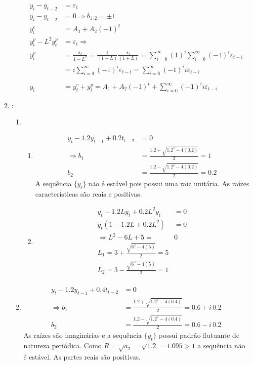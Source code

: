 \begin{enumerate}
\begin{enumerate}
		\begin{align*}
			y_t-y_{t-2}&=\varepsilon_t\\
			y_t-y_{t-2}&=0 \Rightarrow b_{1,2}=\pm1\\
			y_t^c&=A_1+A_2(-1)^t\\
			y_t^p-L^2y_t^p&=\varepsilon_t\Rightarrow\\ y_t^p&=\frac{\varepsilon_t}{1-L^2}=\frac{1}{(1-L)}\frac{\varepsilon_t}{(1+L)}=\sum \limits_{i=0}^{\infty}(1)^i\sum \limits_{i=0}^{\infty}(-1)^i\varepsilon_{t-i}\\
			&=i\sum \limits_{i=0}^{\infty}(-1)^i\varepsilon_{t-i}=\sum \limits_{i=0}^{\infty}(-1)^ii\varepsilon_{t-i}\\
			\\
			y_t&=y_t^c+y_t^p=A_1+A_2(-1)^t+\sum \limits_{i=0}^{\infty}(-1)^ii\varepsilon_{t-i}
		\end{align*}
	
	\end{enumerate}
	
	\item %
	:
	\begin{enumerate}
		
		\item %
		\begin{enumerate}
			\item %
		
		\begin{align*}
			y_t-1.2y_{t-1}+0.2t_{t-2}&=0\\
			\Rightarrow b_1&=\frac{1.2+\sqrt{1.2^2-4(0.2)}}{2}=1\\
			b_2&=\frac{1.2-\sqrt{1.2^2-4(0.2)}}{2}=0.2
		\end{align*}		
		A sequência $\{y_t\}$ não é estável pois possui uma raiz unitária. As raízes características são reais e positivas.
		
		\item %
		
		\begin{align*}
			y_t-1.2Ly_t+0.2L^2y_t&=0\\
			y_t(1-1.2L+0.2L^2)&=0\\
			\Rightarrow L^2-6L+5=&0\\
			L_1=3+\frac{\sqrt{6^2-4(5)}}{2}=5\\
			L_2=3-\frac{\sqrt{6^2-4(5)}}{2}=1\\
			\end{align*}
			
	\end{enumerate}
		\item %
		\begin{align*}
				y_t-1.2y_{t-1}+0.4t_{t-2}&=0\\
				\Rightarrow b_1&=\frac{1.2+\sqrt{1.2^2-4(0.4)}}{2}=0.6+i\,0.2\\
				b_2&=\frac{1.2-\sqrt{1.2^2-4(0.4)}}{2}=0.6-i\,0.2
			\end{align*}
		As raízes são imaginárias e a sequência $\{y_t\}$ possui padrão flutuante de natureza periódica. Como $R=\sqrt{a_2}=\sqrt{1.2}=1.095>1$ a sequência não é estável. As partes reais são positivas.
		

\end{enumerate}
\end{enumerate}
